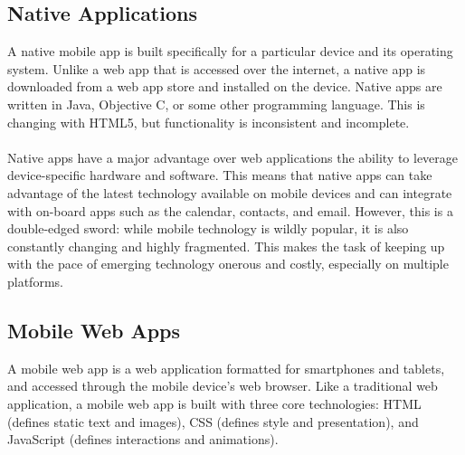 \subsection{Native Applications}

A native mobile app is built specifically for a particular device and its operating system. Unlike a web app that is accessed over the internet, a native app is downloaded from a web app store and installed on the device. Native apps are written in Java, Objective C, or some other programming language. This is changing with HTML5, but functionality is inconsistent and incomplete.



\paragraph{}

Native apps have a major advantage over web applications the ability to leverage device-specific hardware and software. This means that native apps can take advantage of the latest technology available on mobile devices and can integrate with on-board apps such as the calendar, contacts, and email. However, this is a double-edged sword: while mobile technology is wildly popular, it is also constantly changing and highly fragmented. This makes the task of keeping up with the pace of emerging technology onerous and costly, especially on multiple platforms.








\subsection{Mobile Web Apps}

A mobile web app is a web application formatted for smartphones and tablets, and accessed through the mobile device’s web browser. Like a traditional web application, a mobile web app is built with three core technologies: HTML (defines static text and images), CSS (defines style and presentation), and JavaScript (defines interactions and animations).



\paragraph{}


